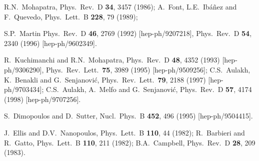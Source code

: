 \documentclass[12pt]{article}
\begin{document}
\begin{thebibliography}{999}
R.N.~Mohapatra, 
  Phys.\ Rev.\ D {\bf 34}, 3457 (1986);
A.~Font, L.E.~Ib\'a\~nez and F.~Quevedo,
  Phys.\ Lett.\ B {\bf 228}, 79 (1989);

S.P.~Martin
  Phys.\ Rev.\ D {\bf 46}, 2769 (1992)
  [hep-ph/9207218],
  Phys.\ Rev.\ D {\bf 54}, 2340 (1996)
  [hep-ph/9602349].

R.~Kuchimanchi and R.N.~Mohapatra, 
  Phys.\ Rev.\ D {\bf 48}, 4352 (1993)
  [hep-ph/9306290],
  Phys.\ Rev.\ Lett.\  {\bf 75}, 3989 (1995)
  [hep-ph/9509256];
C.S.~Aulakh, K.~Benakli and G.~Senjanovi\'c, 
  Phys.\ Rev.\ Lett.\  {\bf 79}, 2188 (1997)
  [hep-ph/9703434];
C.S.~Aulakh, A.~Melfo and G.~Senjanovi\'c, 
  Phys.\ Rev.\ D {\bf 57}, 4174 (1998)
  [hep-ph/9707256].

 S.~Dimopoulos and D.~Sutter,
  Nucl.\ Phys.\ B {\bf 452}, 496 (1995)
  [hep-ph/9504415].

J.~Ellis and D.V.~Nanopoulos,
  Phys.\ Lett.\ B {\bf 110}, 44 (1982);
R.~Barbieri and R.~Gatto,
  Phys.\ Lett.\ B {\bf 110}, 211 (1982);
B.A.~Campbell, 
  Phys.\ Rev.\ D {\bf 28}, 209 (1983).


\end{thebibliography}
\end{document}
